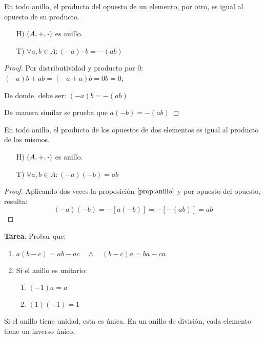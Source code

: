 \begin{proposition} \label{prop:anillo}
	En todo anillo, el producto del opuesto de un elemento, por otro, es igual al opuesto de su producto.
	\begin{itemize}
		\item[H)] $(A, +, \boldsymbol{\cdot})$ es anillo.
		\item[T)] $\forall a, b \in A: (-a) \cdot b = -(ab)$
	\end{itemize}
\end{proposition}
\begin{proof}
	Por distributividad y producto por 0: $ (-a)b + ab = (-a + a)b = 0b = 0 $;
	
	De donde, debe ser: $(-a)b = -(ab)$
	
	De manera similar se prueba que $a(-b) = -(ab)$
\end{proof}

\begin{proposition}
	En todo anillo, el producto de los opuestos de dos elementos es igual al producto de los mismos.
	\begin{itemize}
		\item[H)] $(A, +, \boldsymbol{\cdot})$ es anillo.
		\item[T)] $\forall a, b \in A: (-a) (-b) = ab$
	\end{itemize}
\end{proposition}
\begin{proof}
	Aplicando dos veces la proposición $\ref{prop:anillo}$ y por opuesto del opuesto, resulta:
	\[ (-a)(-b) = -[a(-b)] = -[-(ab)] = ab \]
\end{proof}

\textbf{Tarea}. Probar que:
\begin{enumerate}[label=\alph*)]
	\item $a(b - c) = ab - ac \quad \land \quad (b - c)a = ba - ca$
	\item Si el anillo es unitario:
	\begin{enumerate}[label=\roman*)]
		\item $(-1)a = a$
		\item $(1)(-1) = 1$
	\end{enumerate}
\end{enumerate}

\begin{fmd-theorem}
	Si el anillo tiene unidad, esta es única. En un anillo de división, cada elemento tiene un inverso único.
\end{fmd-theorem}

